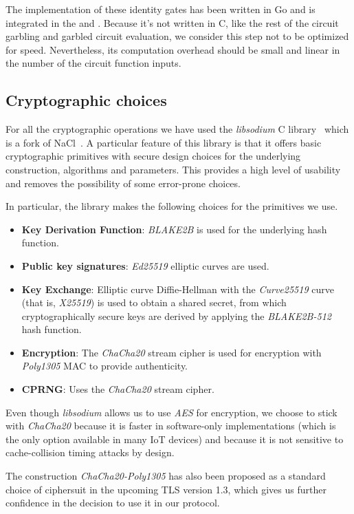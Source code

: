 The implementation of these identity gates has been written in Go and is
integrated in the \broker and \garbler.  Because it's not written in C, like
the rest of the circuit garbling and garbled circuit evaluation, we consider
this step not to be optimized for speed.  Nevertheless, its computation
overhead should be small and linear in the number of the circuit function
inputs.


\vspace{-4pt}
\subsection{Cryptographic choices}

For all the cryptographic operations we have used the \emph{libsodium} C
library~\cite{libsodium} which is a fork of NaCl~\cite{nacl}.  A particular
feature of this library is that it offers basic cryptographic primitives with
secure design choices for the underlying construction, algorithms and
parameters.  This provides a high level of usability and removes the
possibility of some error-prone choices.

In particular, the library makes the following choices for the primitives we use.

\begin{itemize}
  \item \textbf{Key Derivation Function}: \emph{BLAKE2B} is used for the
    underlying hash function.
  \item \textbf{Public key signatures}: \emph{Ed25519} elliptic curves are used.
  \item \textbf{Key Exchange}: Elliptic curve Diffie-Hellman with the
    \emph{Curve25519} curve (that is, \emph{X25519}) is used to obtain a shared
    secret, from which cryptographically secure keys are derived by applying
    the \emph{BLAKE2B-512} hash function.
  \item \textbf{Encryption}: The \emph{ChaCha20} stream cipher is used for
    encryption with \emph{Poly1305} MAC to provide authenticity.
  \item \textbf{CPRNG}: Uses the \emph{ChaCha20} stream cipher.
\end{itemize}

Even though \emph{libsodium} allows us to use \emph{AES} for encryption, we
choose to stick with \emph{ChaCha20} because it is faster in software-only
implementations (which is the only option available in many IoT devices) and
because it is not sensitive to cache-collision timing attacks by design.

The construction \emph{ChaCha20-Poly1305} has also been proposed as a standard
choice of ciphersuit in the upcoming TLS version 1.3, which gives us further
confidence in the decision to use it in our protocol.
